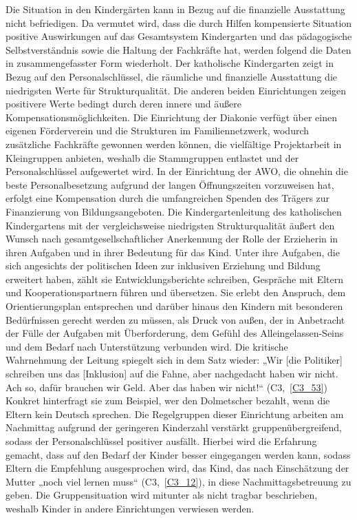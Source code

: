 Die Situation in den Kindergärten kann in Bezug auf die finanzielle Ausstattung nicht befriedigen. Da vermutet wird, dass die durch Hilfen kompensierte Situation positive Auswirkungen auf das Gesamtsystem Kindergarten und das pädagogische Selbstverständnis sowie die Haltung der Fachkräfte hat, werden folgend die Daten in zusammengefasster Form wiederholt. 
Der katholische Kindergarten zeigt in Bezug auf den Personalschlüssel, die räumliche und finanzielle Ausstattung die niedrigsten Werte für Strukturqualität. Die anderen beiden Einrichtungen zeigen positivere Werte bedingt durch deren innere und äußere Kompensationsmöglichkeiten. Die Einrichtung der Diakonie verfügt über einen eigenen Förderverein und die Strukturen im Familiennetzwerk, wodurch zusätzliche Fachkräfte gewonnen werden können, die vielfältige Projektarbeit in Kleingruppen anbieten, weshalb die Stammgruppen entlastet und der Personalschlüssel aufgewertet wird. In der Einrichtung der AWO, die ohnehin die beste Personalbesetzung aufgrund der langen Öffnungszeiten vorzuweisen hat, erfolgt eine Kompensation durch die umfangreichen Spenden des Trägers zur Finanzierung von Bildungsangeboten. Die Kindergartenleitung des katholischen Kindergartens mit der vergleichsweise niedrigsten Strukturqualität äußert den Wunsch nach gesamtgesellschaftlicher Anerkennung der Rolle der Erzieherin in ihren Aufgaben und in ihrer Bedeutung für das Kind. Unter ihre Aufgaben, die sich angesichts der politischen Ideen zur inklusiven Erziehung und Bildung erweitert haben, zählt sie Entwicklungsberichte schreiben, Gespräche mit Eltern und Kooperationspartnern führen und übersetzen. Sie erlebt den Anspruch, dem Orientierungsplan entsprechen und darüber hinaus den Kindern mit besonderen Bedürfnissen gerecht werden zu müssen, als Druck von außen, der in Anbetracht der Fülle der Aufgaben mit Überforderung, dem Gefühl des Alleingelassen-Seins und dem Bedarf nach Unterstützung verbunden wird. Die kritische Wahrnehmung der Leitung spiegelt sich in dem Satz wieder: „Wir {[die Politiker]} schreiben uns das {[Inklusion]} auf die Fahne, aber nachgedacht haben wir nicht. Ach so, dafür brauchen wir Geld. Aber das haben wir nicht!“ (C3,~\ref{C3_53}) Konkret hinterfragt sie zum Beispiel, wer den Dolmetscher bezahlt, wenn die Eltern kein Deutsch sprechen. Die Regelgruppen dieser Einrichtung arbeiten am Nachmittag aufgrund der geringeren Kinderzahl verstärkt gruppenübergreifend, sodass der Personalschlüssel positiver ausfällt. Hierbei wird die Erfahrung gemacht, dass auf den Bedarf der Kinder besser eingegangen werden kann, sodass Eltern die Empfehlung ausgesprochen wird, das Kind, das nach Einschätzung der Mutter „noch viel lernen muss“ (C3,~\ref{C3_12}), in diese Nachmittagsbetreuung zu geben. Die Gruppensituation wird mitunter als nicht tragbar beschrieben, weshalb Kinder in andere Einrichtungen verwiesen werden.
